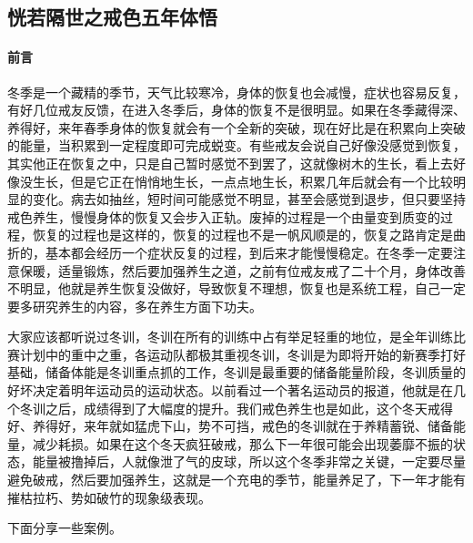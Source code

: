 \subsection{恍若隔世之戒色五年体悟}

\paragraph*{前言}

冬季是一个藏精的季节，天气比较寒冷，身体的恢复也会减慢，症状也容易反复，有好几位戒友反馈，在进入冬季后，身体的恢复不是很明显。如果在冬季藏得深、养得好，来年春季身体的恢复就会有一个全新的突破，现在好比是在积累向上突破的能量，当积累到一定程度即可完成蜕变。有些戒友会说自己好像没感觉到恢复，其实他正在恢复之中，只是自己暂时感觉不到罢了，这就像树木的生长，看上去好像没生长，但是它正在悄悄地生长，一点点地生长，积累几年后就会有一个比较明显的变化。病去如抽丝，短时间可能感觉不明显，甚至会感觉到退步，但只要坚持戒色养生，慢慢身体的恢复又会步入正轨。废掉的过程是一个由量变到质变的过程，恢复的过程也是这样的，恢复的过程也不是一帆风顺是的，恢复之路肯定是曲折的，基本都会经历一个症状反复的过程，到后来才能慢慢稳定。在冬季一定要注意保暖，适量锻炼，然后要加强养生之道，之前有位戒友戒了二十个月，身体改善不明显，他就是养生恢复没做好，导致恢复不理想，恢复也是系统工程，自己一定要多研究养生的内容，多在养生方面下功夫。

大家应该都听说过冬训，冬训在所有的训练中占有举足轻重的地位，是全年训练比赛计划中的重中之重，各运动队都极其重视冬训，冬训是为即将开始的新赛季打好基础，储备体能是冬训重点抓的工作，冬训是最重要的储备能量阶段，冬训质量的好坏决定着明年运动员的运动状态。以前看过一个著名运动员的报道，他就是在几个冬训之后，成绩得到了大幅度的提升。我们戒色养生也是如此，这个冬天戒得好、养得好，来年就如猛虎下山，势不可挡，戒色的冬训就在于养精蓄锐、储备能量，减少耗损。如果在这个冬天疯狂破戒，那么下一年很可能会出现萎靡不振的状态，能量被撸掉后，人就像泄了气的皮球，所以这个冬季非常之关键，一定要尽量避免破戒，然后要加强养生，这就是一个充电的季节，能量养足了，下一年才能有摧枯拉朽、势如破竹的现象级表现。

下面分享一些案例。

